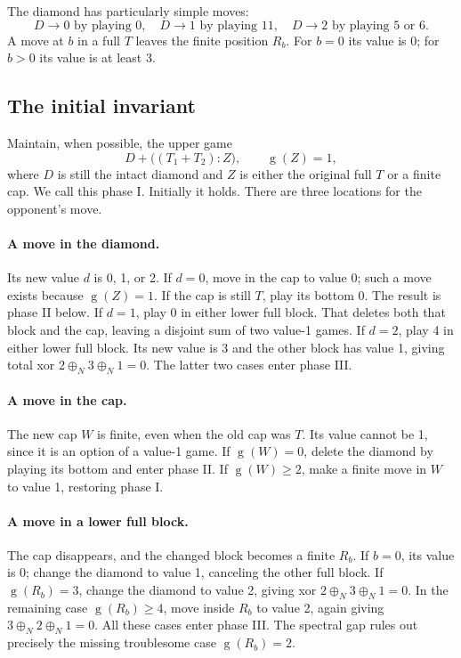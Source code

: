 \documentclass[11pt,letterpaper]{article}
\numberwithin{equation}{section}
\theoremstyle{definition}
\theoremstyle{remark}
\newcommand{\sg}{\operatorname{g}}
\newcommand{\nimadd}{\mathbin{\oplus_{\!N}}}
\begin{document}
The diamond has particularly simple moves:
\[
 D\longrightarrow0\text{ by playing }0,\quad
 D\longrightarrow1\text{ by playing }11,\quad
 D\longrightarrow2\text{ by playing }5\text{ or }6.
\]
A move at $b$ in a full $T$ leaves the finite position $R_b$.
For $b=0$ its value is 0; for $b>0$ its value is at least 3.

\subsection{The initial invariant}

Maintain, when possible, the upper game
\begin{equation}\label{eq:phase-I}
 D+\bigl((T_1+T_2):Z\bigr),\qquad \sg(Z)=1,
\end{equation}
where $D$ is still the intact diamond and $Z$ is either the original
full $T$ or a finite cap. We call this phase I. Initially it holds.
There are three locations for the opponent's move.

\paragraph{A move in the diamond.}
Its new value $d$ is 0, 1, or 2. If $d=0$, move in the cap to value
0; such a move exists because $\sg(Z)=1$. If the cap is still $T$,
play its bottom 0. The result is phase II below. If $d=1$, play 0
in either lower full block. That deletes both that block and the
cap, leaving a disjoint sum of two value-1 games. If $d=2$, play
4 in either lower full block. Its new value is 3 and the other
block has value 1, giving total xor $2\nimadd3\nimadd1=0$.
The latter two cases enter phase III.

\paragraph{A move in the cap.}
The new cap $W$ is finite, even when the old cap was $T$. Its value
cannot be 1, since it is an option of a value-1 game. If
$\sg(W)=0$, delete the diamond by playing its bottom and enter
phase II. If $\sg(W)\geq2$, make a finite move in $W$ to value 1,
restoring phase I.

\paragraph{A move in a lower full block.}
The cap disappears, and the changed block becomes a finite $R_b$.
If $b=0$, its value is 0; change the diamond to value 1, canceling
the other full block. If $\sg(R_b)=3$, change the diamond to
value 2, giving xor $2\nimadd3\nimadd1=0$. In the remaining case
$\sg(R_b)\geq4$, move inside $R_b$ to value 2, again giving
$3\nimadd2\nimadd1=0$. All these cases enter phase III.
The spectral gap rules out precisely the missing troublesome case
$\sg(R_b)=2$.
\end{document}
